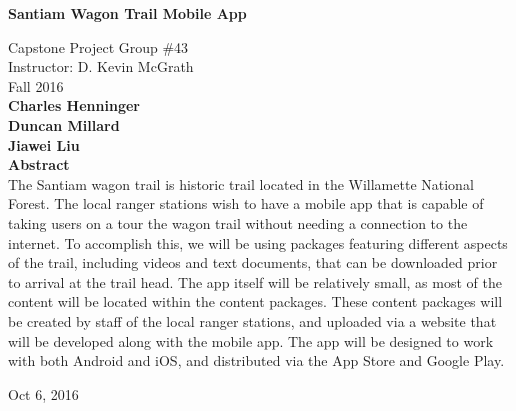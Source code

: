 \documentclass[letterpaper,10pt,titlepage]{article}
\begin{document}
\begin{titlepage}
\begin{center}
    \Huge
    \textbf{Santiam Wagon Trail Mobile App}
    
    \vspace{0.5cm}
    \large
    Capstone Project Group \#43\\
    \vspace{0.5cm}
    \large
    Instructor: D. Kevin McGrath\\
    \vspace{0.5cm}
    \large
    Fall 2016\\
    
    \vspace{0.5cm}
    \textbf{Charles Henninger}\\
    \textbf{Duncan Millard}\\
    \textbf{Jiawei Liu}\\
    
    \vspace{1.5cm}
    \textbf{Abstract}\\
    \vspace{0.5cm}
    The Santiam wagon trail is historic trail located in the Willamette National Forest. The local ranger stations wish to have a mobile app that is capable of taking users on a tour the wagon trail without needing a connection to the internet. To accomplish this, we will be using packages featuring different aspects of the trail, including videos and text documents, that can be downloaded prior to arrival at the trail head. The app itself will be relatively small, as most of the content will be located within the content packages.  These content packages will be created by staff of the local ranger stations, and uploaded via a website that will be developed along with the mobile app. The app will be designed to work with both Android and iOS, and distributed via the App Store and Google Play.

    
    \vspace{0.8cm}
    \vfill
    
    Oct 6, 2016

\end{center}
\end{titlepage}
\end{document}
